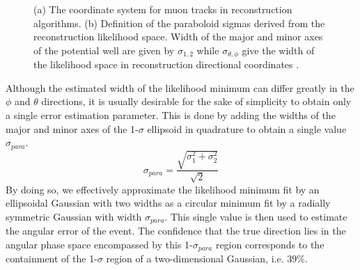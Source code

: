 \documentclass{gatech-thesis}
\begin{document}
\begin{figure}
\centering
{}
\caption[Reconstruction Track Coordinate System and Paraboloid Sigma Definition]{(a) The coordinate system for muon tracks in reconstruction algorithms. (b) Definition of the paraboloid sigmas derived from the reconstruction likelihood space. Width of the major and minor axes of the potential well are given by $\sigma_{1,2}$ while $\sigma_{\theta , \phi}$ give the width of the likelihood space in reconstruction directional coordinates \cite{2006APh....25..220N}.}
\label{fig:ParaCoord}
\end{figure}

Although the estimated width of the likelihood minimum can differ greatly in the $\phi$ and $\theta$ directions, it is usually desirable for the sake of simplicity to obtain only a single error estimation parameter. This is done by adding the widths of the major and minor axes of the 1-$\sigma$ ellipsoid in quadrature to obtain a single value $\sigma_{para}$.
\begin{equation}
\sigma_{para} = \frac{\sqrt{\sigma_{1}^2 + \sigma_{2}^2}}{\sqrt{2}}
\end{equation}
By doing so, we effectively approximate the likelihood minimum fit by an ellipsoidal Gaussian with two widths as a circular minimum fit by a radially symmetric Gaussian with width $\sigma_{para}$. This single value is then used to estimate the angular error of the event. The confidence that the true direction lies in the angular phase space encompassed by this 1-$\sigma_{para}$ region corresponds to the containment of the 1-$\sigma$ region of a two-dimensional Gaussian, i.e. 39$\%$.
\end{document}
